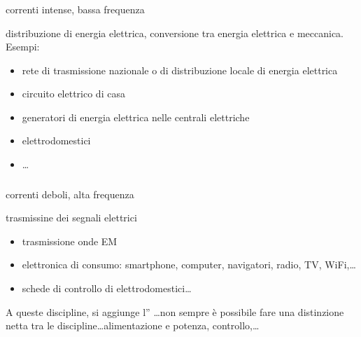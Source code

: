 \documentclass[letterpaper,10pt,italian]{jupyterBook}
\begin{document}
\subsubsection*{}

\sphinxAtStartPar
{} correnti intense, bassa frequenza

\sphinxAtStartPar
{} distribuzione di energia elettrica, conversione tra energia elettrica e meccanica. Esempi:
\begin{itemize}
\item {} 
\sphinxAtStartPar
rete di trasmissione nazionale o di distribuzione locale di energia elettrica

\item {} 
\sphinxAtStartPar
circuito elettrico di casa

\item {} 
\sphinxAtStartPar
generatori di energia elettrica nelle centrali elettriche

\item {} 
\sphinxAtStartPar
elettrodomestici

\item {} 
\sphinxAtStartPar
…

\end{itemize}
\subsubsection*{}

\sphinxAtStartPar
{} correnti deboli, alta frequenza

\sphinxAtStartPar
{} trasmissine dei segnali elettrici
\begin{itemize}
\item {} 
\sphinxAtStartPar
trasmissione onde EM

\item {} 
\sphinxAtStartPar
elettronica di consumo: smartphone, computer, navigatori, radio, TV, Wi\sphinxhyphen{}Fi,…

\item {} 
\sphinxAtStartPar
schede di controllo di elettrodomestici…

\end{itemize}

\sphinxAtStartPar
A queste discipline, si aggiunge l” …non sempre è possibile fare una distinzione netta tra le discipline…alimentazione e potenza, controllo,…
\end{document}
